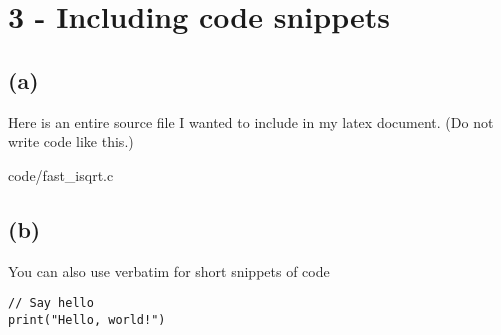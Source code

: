 \section*{3 - Including code snippets}

\subsection*{(a)}

Here is an entire source file I wanted to include in my latex document. (Do not write code like this.)

\begin{figure*}[h]
\begin{lstinputlisting}[language=C, caption=Fast inverse square root, label={lst:fast_isqrt}]{code/fast_isqrt.c}
\end{lstinputlisting}
\end{figure*}

\subsection*{(b)}
You can also use verbatim for short snippets of code
\begin{verbatim}
// Say hello
print("Hello, world!")
\end{verbatim}
